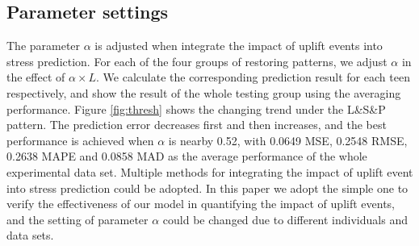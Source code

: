 \subsection{Parameter settings}
\label{sec:parameter}
The parameter $\alpha$ is adjusted when integrate the impact of uplift events into stress prediction.
For each of the four groups of restoring patterns,
we adjust $\alpha$ in the effect of $\alpha \times L$.
We calculate the corresponding prediction result for each teen respectively,
and show the result of the whole testing group using the averaging performance.
Figure \ref{fig:thresh} shows the changing trend under the L\&S\&P pattern.
The prediction error decreases first and then increases,
and the best performance is achieved when $\alpha$ is nearby 0.52,
with 0.0649 MSE, 0.2548 RMSE, 0.2638 MAPE and 0.0858 MAD as the average performance of the whole experimental data set.
Multiple methods for integrating the impact of uplift event into stress prediction could be adopted.
In this paper we adopt the simple one to verify the effectiveness of our model in quantifying the impact of uplift events,
and the setting of parameter $\alpha$ could be changed due to different individuals and data sets.
